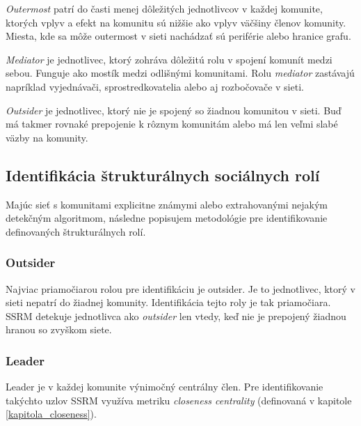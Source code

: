 \documentclass[slovak,master,public,dept460,male,cpdeclaration,oneside]{diploma}
\begin{document}
 
\begin{definition}
\textit{Outermost} patrí do časti menej dôležitých jednotlivcov v každej komunite, ktorých vplyv a efekt na komunitu sú nižšie ako vplyv väčšiny členov komunity. Miesta, kde sa môže outermost v sieti nachádzať sú periférie alebo hranice grafu.
\end{definition}

\begin{definition}
\textit{Mediator} je jednotlivec, ktorý zohráva dôležitú rolu v spojení komunít medzi sebou. Funguje ako mostík medzi odlišnými komunitami. Rolu \textit{mediator} zastávajú napríklad vyjednávači, sprostredkovatelia alebo aj rozbočovače v sieti.  
\end{definition}

\begin{definition}
\textit{Outsider} je jednotlivec, ktorý nie je spojený so žiadnou komunitou v sieti. Buď má takmer rovnaké prepojenie k rôznym komunitám alebo má len veľmi slabé väzby na komunity.
\end{definition}


\subsection{Identifikácia štrukturálnych sociálnych rolí} \label{identifikacia}
Majúc sieť s komunitami explicitne známymi alebo extrahovanými nejakým detekčným algoritmom, následne popisujem metodológie pre identifikovanie definovaných štrukturálnych rolí.

\subsubsection{Outsider}

Najviac priamočiarou rolou pre identifikáciu je outsider. Je to jednotlivec, ktorý v sieti nepatrí do žiadnej komunity. Identifikácia tejto roly je tak priamočiara. SSRM detekuje jednotlivca ako \textit{outsider} len vtedy, keď nie je prepojený žiadnou hranou so zvyškom siete.


\subsubsection{Leader}

Leader je v každej komunite výnimočný centrálny člen. Pre identifikovanie takýchto uzlov SSRM využíva metriku \textit{closeness centrality} (definovaná v kapitole \ref{kapitola_closeness}).
\end{document}
